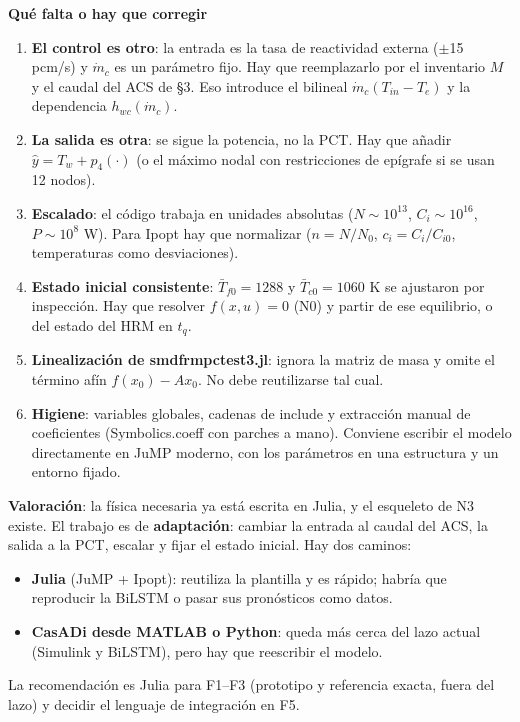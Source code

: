 \documentclass[11pt,a4paper]{article}
\newcommand{\codeus}{\textunderscore\allowbreak}
\newcommand{\code}[1]{{\small\ttfamily\let\_\codeus #1}}
\begin{document}
\textbf{Qué falta o hay que corregir}

\begin{enumerate}
\item \textbf{El control es otro}: la entrada es la tasa de reactividad externa ($\pm$15 pcm/s) y $\dot m_c$ es un parámetro fijo. Hay que reemplazarlo por el inventario $M$ y el caudal del ACS de \S{}3. Eso introduce el bilineal $\dot m_c(T_{in}-T_e)$ y la dependencia $h_{wc}(\dot m_c)$.
\item \textbf{La salida es otra}: se sigue la potencia, no la PCT. Hay que añadir $\hat y=T_w+p_4(\cdot)$ (o el máximo nodal con restricciones de epígrafe si se usan 12 nodos).
\item \textbf{Escalado}: el código trabaja en unidades absolutas ($N\sim10^{13}$, $C_i\sim10^{16}$, $P\sim10^8$ W). Para Ipopt hay que normalizar ($n=N/N_0$, $c_i=C_i/C_{i0}$, temperaturas como desviaciones).
\item \textbf{Estado inicial consistente}: $\bar T_{f0}=1288$ y $\bar T_{c0}=1060$ K se ajustaron por inspección. Hay que resolver $f(x,u)=0$ (N0) y partir de ese equilibrio, o del estado del HRM en $t_q$.
\item \textbf{Linealización de \code{smdfr\_mpc\_test\_3.jl}}: ignora la matriz de masa y omite el término afín $f(x_0)-Ax_0$. No debe reutilizarse tal cual.
\item \textbf{Higiene}: variables globales, cadenas de \code{include} y extracción manual de coeficientes (\code{Symbolics.coeff} con parches a mano). Conviene escribir el modelo directamente en JuMP moderno, con los parámetros en una estructura y un entorno fijado.
\end{enumerate}

\textbf{Valoración}: la física necesaria ya está escrita en Julia, y el esqueleto de N3 existe. El trabajo es de \textbf{adaptación}: cambiar la entrada al caudal del ACS, la salida a la PCT, escalar y fijar el estado inicial. Hay dos caminos:

\begin{itemize}
\item \textbf{Julia} (JuMP + Ipopt): reutiliza la plantilla y es rápido; habría que reproducir la BiLSTM o pasar sus pronósticos como datos.
\item \textbf{CasADi desde MATLAB o Python}: queda más cerca del lazo actual (Simulink y BiLSTM), pero hay que reescribir el modelo.
\end{itemize}

La recomendación es Julia para F1–F3 (prototipo y referencia exacta, fuera del lazo) y decidir el lenguaje de integración en F5.
\end{document}
